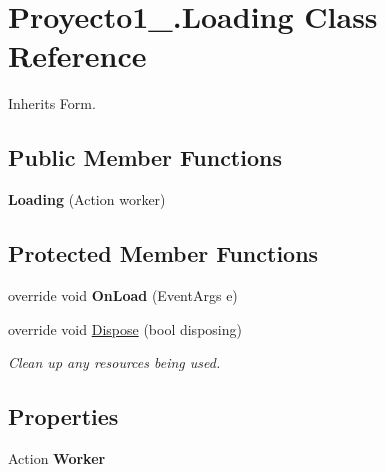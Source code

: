 \hypertarget{class_proyecto1__1096917_1_1_loading}{}\section{Proyecto1\+\_.\+Loading Class Reference}
\label{class_proyecto1__1096917_1_1_loading}


Inherits Form.

\subsection*{Public Member Functions}
\begin{DoxyCompactItemize}
\item 
\mbox{\label{class_proyecto1__1096917_1_1_loading_a45d14f1671da4e54ff56be663fba34cd}} 
{\bfseries Loading} (Action worker)
\end{DoxyCompactItemize}
\subsection*{Protected Member Functions}
\begin{DoxyCompactItemize}
\item 
\mbox{\label{class_proyecto1__1096917_1_1_loading_a9ad9fb83835e029c8ebdc07c3d729f91}} 
override void {\bfseries On\+Load} (Event\+Args e)
\item 
override void \mbox{\hyperlink{class_proyecto1__1096917_1_1_loading_a377074dd9fbc481999dd330adf7f69a0}{Dispose}} (bool disposing)
\begin{DoxyCompactList}\small\item\em Clean up any resources being used. \end{DoxyCompactList}\end{DoxyCompactItemize}
\subsection*{Properties}
\begin{DoxyCompactItemize}
\item 
\mbox{\label{class_proyecto1__1096917_1_1_loading_adb3cddec013a972ba3b59fea4b9a175a}} 
Action {\bfseries Worker}
\end{DoxyCompactItemize}


